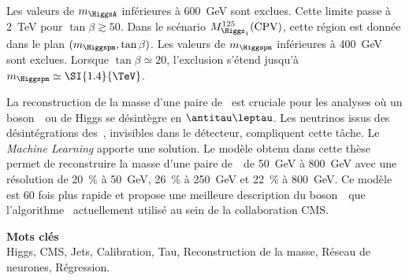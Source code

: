 Les valeurs de $m_{\HiggsA}$ inférieures à \SI{600}{\GeV} sont exclues.
Cette limite passe à
\SI{2}{\TeV} pour $\tan\beta\gtrsim\num{50}$.
Dans le scénario $M_{\Higgs_1}^{125}(\text{CPV})$,
cette région est donnée dans le plan $(m_{\Higgspm},\tan\beta)$.
Les valeurs de $m_{\Higgspm}$ inférieures à \SI{400}{\GeV} sont exclues.
Lorsque
$\tan\beta\simeq\num{20}$,
l'exclusion s'étend jusqu'à
$m_{\Higgspm} \simeq \SI{1.4}{\TeV}$.
\par
La reconstruction de la masse d'une paire de \tau\
est cruciale pour les analyses
où un boson~\Zboson\ ou de Higgs se désintègre en $\antitau\leptau$.
Les neutrinos issus des désintégrations des~\tau, invisibles dans le détecteur, compliquent cette tâche.
Le \emph{Machine Learning} apporte une solution.
Le modèle obtenu dans cette thèse permet
de reconstruire la masse d'une paire de~\tau\
de \SI{50}{\GeV} à \SI{800}{\GeV}
avec une résolution de
\SI{20}{\%} à \SI{50}{\GeV},
\SI{26}{\%} à \SI{250}{\GeV} et
\SI{22}{\%} à \SI{800}{\GeV}.
Ce modèle est
60 fois plus rapide
et propose une meilleure description du boson~\Zboson\
que l'algorithme \SVFIT\ actuellement utilisé au sein de la collaboration CMS.

\vfill

\noindent\textbf{\Large\sffamily Mots clés}\\
Higgs,
CMS,
Jets,
Calibration,
Tau,
Reconstruction de la masse,
Réseau de neurones,
Régression.

\vspace{2\baselineskip}